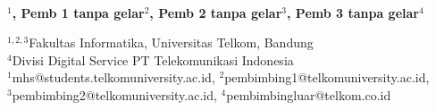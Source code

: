  
  \begin{center}
      \textbf{\large \Title}\\
      \bigskip 
  \end{center}
  
  
  
   \begin{center}
     \bf \Author$^1$, Pemb 1 tanpa gelar$^2$, Pemb 2 tanpa gelar$^3$, Pemb 3 tanpa gelar$^4$ 
  \end{center}
  
  
   \begin{center}
     $^{1,2,3}$Fakultas Informatika, Universitas Telkom, Bandung\\
$^4$Divisi Digital Service PT Telekomunikasi Indonesia\\
$^1$mhs@students.telkomuniversity.ac.id, $^2$pembimbing1@telkomuniversity.ac.id,\\ $^3$pembimbing2@telkomuniversity.ac.id, $^4$pembimbingluar@telkom.co.id 
  \end{center}
  
   
   
